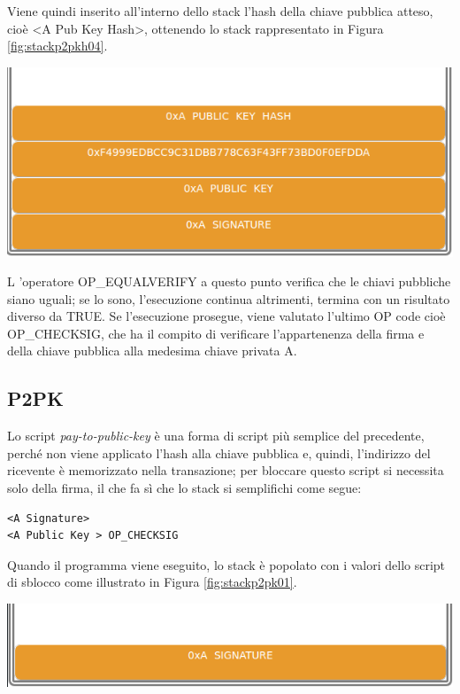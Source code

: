 Viene quindi inserito all’interno dello stack l’hash della chiave pubblica atteso, cioè <A Pub Key Hash>, ottenendo lo stack rappresentato in Figura \ref{fig:stackp2pkh04}.

{\centering
\vspace{15pt}
\includegraphics[scale=0.35]{images/script/p2pkh/4.png}
\vspace{10pt}
\par}

L ’operatore OP\_EQUALVERIFY a questo punto verifica che le chiavi pubbliche siano uguali; se lo sono, l’esecuzione continua altrimenti, termina con un risultato diverso da TRUE. Se l’esecuzione prosegue, viene valutato l’ultimo OP code cioè OP\_CHECKSIG, che ha il compito di verificare l’appartenenza della firma e della chiave pubblica alla medesima chiave privata A.

\subsection{P2PK}
Lo script {\it pay-to-public-key \/} è una forma di script più semplice del precedente, perché non viene applicato l’hash alla chiave pubblica e, quindi, l’indirizzo del ricevente è memorizzato nella transazione; per bloccare questo script si necessita solo della firma, il che fa sì che lo stack si semplifichi come segue:
\begin{lstlisting}[language=bitcoinscript, caption={P2PK Script completo.}]
<A Signature>
<A Public Key > OP_CHECKSIG
\end{lstlisting}

Quando il programma viene eseguito, lo stack è popolato con i valori dello script di sblocco come illustrato in Figura \ref{fig:stackp2pk01}.

{\centering
\vspace{10pt}
\includegraphics[scale=0.35]{images/script/p2pk/1.png}
\vspace{10pt}
\par}

